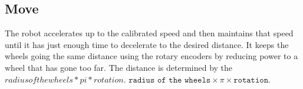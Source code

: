 \subsection{Move}
The robot accelerates up to the calibrated speed and then maintains that speed until it has just enough time to decelerate to the desired distance. It keeps the wheels going the same distance using the rotary encoders by reducing power to a wheel that has gone too far. The distance is determined by the $ radius of the wheels * pi * rotation $. 
 $\texttt{radius of the wheels} \times \pi \times \texttt{rotation}$. 
